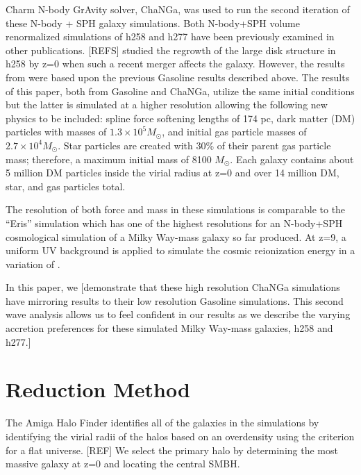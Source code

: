 \documentclass[manuscript]{aastex}
\begin{document}
Charm N-body GrAvity solver, ChaNGa, was used to run the second iteration of these N-body + SPH galaxy simulations.	Both N-body+SPH volume renormalized simulations of h258 and h277 have been previously examined in other publications. [REFS] \cite{Governato2009} studied the regrowth of the large disk structure in h258 by z=0 when such a recent merger affects the galaxy. However, the results from \cite{Governato2009} were based upon the previous Gasoline results described above. The results of this paper, both from Gasoline and ChaNGa, utilize the same initial conditions but the latter is simulated at a higher resolution allowing the following new physics to be included: spline force softening lengths of 174 pc, dark matter (DM) particles with masses of $1.3 \times 10^5 M_{\odot}$, and initial gas particle masses of $2.7 \times 10^4 M_{\odot}$. Star particles are created with 30\% of their parent gas particle mass; therefore, a maximum initial mass of 8100 $M_{\odot}$. Each galaxy contains about 5 million DM particles inside the virial radius at z=0 and over 14 million DM, star, and gas particles total.
	
	
The resolution of both force and mass in these simulations is comparable to the ``Eris'' simulation which has one of the highest resolutions for an N-body+SPH cosmological simulation of a Milky Way-mass galaxy so far produced.  At z=9, a uniform UV background is applied to simulate the cosmic reionization energy in a variation of \cite{Haardt2012}.

In this paper, we [demonstrate that these high resolution ChaNGa simulations have mirroring results to their low resolution Gasoline simulations. This second wave analysis allows us to feel confident in our results as we describe the varying accretion preferences for these simulated Milky Way-mass galaxies, h258 and h277.]
	
	

\section{Reduction Method}\label{redux}

	
The Amiga Halo Finder identifies all of the galaxies in the simulations by identifying the virial radii of the halos based on an overdensity using the criterion for a flat universe. [REF] We select the primary halo by determining the most massive galaxy at z=0 and locating the central SMBH. 
\end{document}
